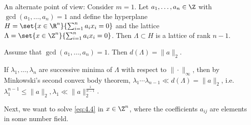 An alternate point of view: Consider \( m=1 \).
Let \( a_1, \dotsc, a_n \in \Z \) with \( \gcd(a_1, \dotsc, a_n) = 1 \) and define the hyperplane \( H = \set{x \in \R^n}{\sum_{i=1}^{n} a_ix_i = 0} \) and the lattice \( \Lambda = \set{x \in \Z^n}{\sum_{i=1}^{n} a_ix_i = 0} \).
Then \( \Lambda \subset H \) is a lattice of rank \( n-1 \).

\begin{lem}
	Assume that \( \gcd(a_1, \dotsc, a_n)=1 \).
	Then \( d(\Lambda) = \|a\|_2 \).
\end{lem}

If \( \lambda_1, \dotsc, \lambda_n \) are successive minima of \( \Lambda \) with respect to \( \|\cdot\|_\infty \), then by Minkowski's second convex body theorem, \( \lambda_1 \dotsm \lambda_{n-1} \ll  d(\Lambda) = \|a\|_2 \), i.e. \( \lambda_1^{n-1} \leq \|a\|_2, \lambda_1 \ll \|a\|_2^\frac{1}{n-1} \).

Next, we want to solve \eqref{eq:4.4} in \( x \in \Z^n \), where the coefficients \( a_{ij} \) are elements in some number field.

